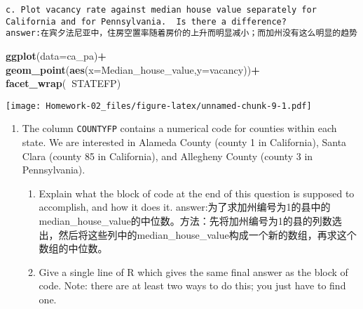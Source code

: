 \documentclass[
]{article}
\newenvironment{Shaded}{\begin{snugshade}}{\end{snugshade}}
\newcommand{\DataTypeTok}[1]{\textcolor[rgb]{0.13,0.29,0.53}{#1}}
\newcommand{\DecValTok}[1]{\textcolor[rgb]{0.00,0.00,0.81}{#1}}
\newcommand{\KeywordTok}[1]{\textcolor[rgb]{0.13,0.29,0.53}{\textbf{#1}}}
\newcommand{\NormalTok}[1]{#1}
\newcommand{\OperatorTok}[1]{\textcolor[rgb]{0.81,0.36,0.00}{\textbf{#1}}}
\newcommand{\StringTok}[1]{\textcolor[rgb]{0.31,0.60,0.02}{#1}}
\providecommand{\tightlist}{%
  \setlength{\itemsep}{0pt}\setlength{\parskip}{0pt}}
\begin{document}
\begin{verbatim}
c. Plot vacancy rate against median house value separately for California and for Pennsylvania.  Is there a difference?
answer:在宾夕法尼亚中，住房空置率随着房价的上升而明显减小；而加州没有这么明显的趋势
\end{verbatim}

\begin{Shaded}
\begin{Highlighting}[]
\KeywordTok{ggplot}\NormalTok{(}\DataTypeTok{data=}\NormalTok{ca_pa)}\OperatorTok{+}
\StringTok{  }\KeywordTok{geom_point}\NormalTok{(}\KeywordTok{aes}\NormalTok{(}\DataTypeTok{x=}\NormalTok{Median_house_value,}\DataTypeTok{y=}\NormalTok{vacancy))}\OperatorTok{+}
\StringTok{  }\KeywordTok{facet_wrap}\NormalTok{(}\OperatorTok{~}\NormalTok{STATEFP)}
\end{Highlighting}
\end{Shaded}

\texttt{[image: Homework-02\_files/figure-latex/unnamed-chunk-9-1.pdf]}

\begin{enumerate}
\def\labelenumi{\arabic{enumi}.}
\setcounter{enumi}{3}
\tightlist
\item
  The column \texttt{COUNTYFP} contains a numerical code for counties
  within each state. We are interested in Alameda County (county 1 in
  California), Santa Clara (county 85 in California), and Allegheny
  County (county 3 in Pennsylvania).

  \begin{enumerate}
  \def\labelenumii{\alph{enumii}.}
  \tightlist
  \item
    Explain what the block of code at the end of this question is
    supposed to accomplish, and how it does it.
    answer:为了求加州编号为1的县中的median\_house\_value的中位数。方法：先将加州编号为1的县的列数选出，然后将这些列中的median\_house\_value构成一个新的数组，再求这个数组的中位数。
  \item
    Give a single line of R which gives the same final answer as the
    block of code. Note: there are at least two ways to do this; you
    just have to find one.
  \end{enumerate}
\end{enumerate}

\begin{Shaded}
\end{Shaded}
\end{document}
